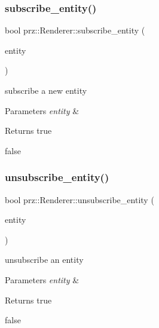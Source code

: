 \subsubsection{\texorpdfstring{subscribe\_entity()}{subscribe\_entity()}}
{\footnotesize\ttfamily bool prz\+::\+Renderer\+::subscribe\+\_\+entity (\begin{DoxyParamCaption}\item[{P\+S\+Ptr$<$ \mbox{\hyperlink{classprz_1_1_entity}{Entity}} $>$}]{entity }\end{DoxyParamCaption})}



subscribe a new entity 


\begin{DoxyParams}{Parameters}
{\em entity} & \\
\hline
\end{DoxyParams}
\begin{DoxyReturn}{Returns}
true 

false 
\end{DoxyReturn}
\mbox{\label{classprz_1_1_renderer_acc8bf8513b1b3c9e649ff34a93abd18f}} 
\subsubsection{\texorpdfstring{unsubscribe\_entity()}{unsubscribe\_entity()}}
{\footnotesize\ttfamily bool prz\+::\+Renderer\+::unsubscribe\+\_\+entity (\begin{DoxyParamCaption}\item[{P\+S\+Ptr$<$ \mbox{\hyperlink{classprz_1_1_entity}{Entity}} $>$}]{entity }\end{DoxyParamCaption})}



unsubscribe an entity 


\begin{DoxyParams}{Parameters}
{\em entity} & \\
\hline
\end{DoxyParams}
\begin{DoxyReturn}{Returns}
true 

false 
\end{DoxyReturn}
\mbox{\label{classprz_1_1_renderer_a6afd9f0501d72f9a128625ad2d28a59d}} 
